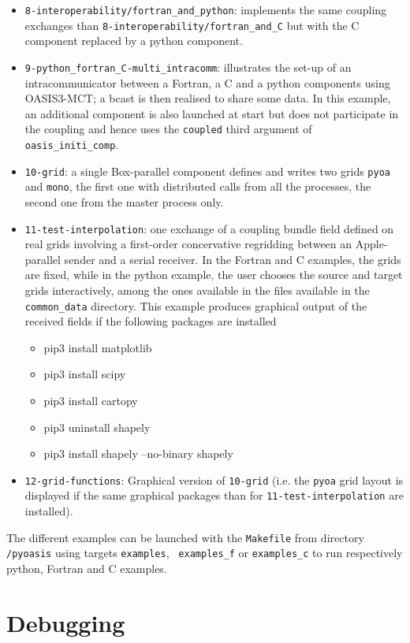 \begin{itemize}
\item{{\tt 8-interoperability/fortran\_and\_python}}: implements the same coupling exchanges than {{\tt 8-interoperability/fortran\_and\_C}} but with the C component replaced by a python component.
\item{{\tt 9-python\_fortran\_C-multi\_intracomm}}: illustrates the set-up of an intracommunicator between a Fortran, a C and a python components using OASIS3-MCT; a bcast is then realised to share some data. In this example, an additional component is also launched at start but does not participate in the coupling and hence uses the {\tt coupled} third argument of {\tt oasis\_initi\_comp}.
\item{{\tt 10-grid}}: a single Box-parallel component defines and writes two grids {\tt pyoa} and {\tt mono}, the first one with distributed calls from all the processes, the second one from the master process only.
\item{{\tt 11-test-interpolation}}: one exchange of a coupling bundle field defined on real grids involving a first-order concervative regridding between an Apple-parallel sender and a serial receiver.  In the Fortran and C examples, the grids are fixed, while in the python example, the user chooses the source and target grids interactively, among the ones available in the files available in the {\tt common\_data} directory. This example produces graphical output of the received fields if the following packages are installed
\begin{itemize}
\item pip3 install matplotlib
\item pip3 install scipy
\item pip3 install cartopy
\item pip3 uninstall shapely
\item pip3 install shapely --no-binary shapely
\end{itemize}
\item{\tt 12-grid-functions}: Graphical version of {{\tt 10-grid}} (i.e. the {\tt pyoa} grid layout is displayed if the same graphical packages than for {{\tt 11-test-interpolation}} are installed).
\end{itemize}

The different examples can be launched with the {\tt Makefile} from
directory {\tt /pyoasis} using targets {\tt examples}, {\tt
  examples\_f} or 
  {\tt examples\_c} to run respectively python, Fortran and C examples.

\section{Debugging}
\label{subsec_debug}

